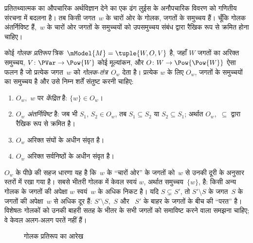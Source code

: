 \documentclass[../../../include/open-logic-section]{subfiles}
\begin{document}


प्रतितथ्यात्मक का औपचारिक अर्थविज्ञान देने का एक ढंग लुईस के अनौपचारिक विवरण
को गणितीय संरचना में बदलना है। तब किसी जगत~$w$ के चारों ओर के गोलक, जगतों
के समुच्चय हैं। चूँकि गोलक अंतर्निविष्ट हैं,~$w$ के चारों ओर जगतों के
समुच्चयों को उपसमुच्चय संबंध द्वारा रैखिक रूप से क्रमित होना चाहिए।

\begin{defn}
  कोई \emph{गोलक प्रतिरूप} त्रिक~$\mModel{M} = \tuple{W, O, V}$ है, जहाँ
  $W$ जगतों का अरिक्त समुच्चय, $V\colon \PVar \to \Pow{W}$ कोई मूल्यांकन,
  और $O\colon W \to \Pow{\Pow{W}}$ ऐसा फलन है जो प्रत्येक जगत~$w$ को
  \emph{गोलक-तंत्र}~$O_w$ देता है। प्रत्येक $w$ के लिए $O_w$, जगतों के
  समुच्चयों का समुच्चय है और उसे निम्न शर्तें संतुष्ट करनी चाहिए:
  \begin{enumerate}
  \item $O_w$,~$w$ पर \emph{केंद्रित} है: $\{w\} \in O_w$।
  \item $O_w$ \emph{अंतर्निविष्ट} है: जब भी $S_1$, $S_2 \in O_w$, तब
    $S_1 \subseteq S_2$ या $S_2 \subseteq S_1$; अर्थात $O_w$,~$\subseteq$
    द्वारा रैखिक रूप से क्रमित है।
  \item $O_w$ अरिक्त संघों के अधीन संवृत है।
  \item $O_w$ अरिक्त सर्वनिष्ठों के अधीन संवृत है।
  \end{enumerate}
\end{defn}

$O_w$ के पीछे की सहज धारणा यह है कि~$w$ के ``चारों ओर'' के जगतों को~$w$ से
उनकी दूरी के अनुसार स्तरों में रखा गया है। सबसे भीतरी गोलक में केवल स्वयं
$w$, अर्थात समुच्चय~$\{w\}$, है: किसी अन्य गोलक के जगतों की अपेक्षा $w$
स्वयं~$w$ के अधिक निकट है। यदि $S \subsetneq S'$, तो $S' \setminus S$ के
जगत~$S$ के जगतों की अपेक्षा~$w$ से अधिक दूर हैं: $S' \setminus S$,~$S$ और
~$S'$ के बाहर के जगतों के बीच की ``परत'' है। विशेषतः गोलकों को उनकी बाहरी
सतह के भीतर के सभी जगतों को समाविष्ट करने वाला समझना चाहिए; वे केवल अलग-अलग
परतें नहीं हैं।

\begin{figure}
\begin{center}
\caption{गोलक प्रतिरूप का आरेख}
\end{center}
\end{figure}
\end{document}

